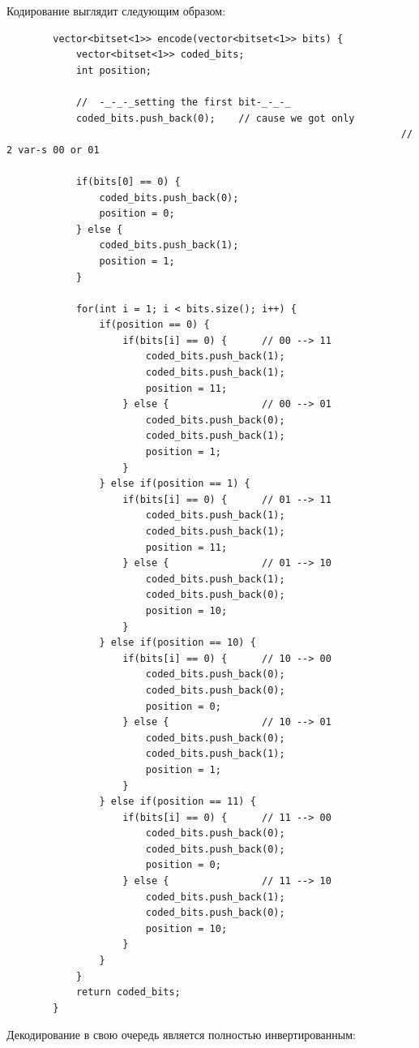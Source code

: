 \documentclass[utf8,14pt,a4paper,oneside,russian]{book}
\begin{document}
	Кодирование выглядит следующим образом:
	\begin{lstlisting}
		vector<bitset<1>> encode(vector<bitset<1>> bits) {
			vector<bitset<1>> coded_bits;
			int position;
			
			//  -_-_-_setting the first bit-_-_-_
			coded_bits.push_back(0);    // cause we got only
																	// 2 var-s 00 or 01
			
			if(bits[0] == 0) {
				coded_bits.push_back(0);
				position = 0;
			} else {
				coded_bits.push_back(1);
				position = 1;
			}
			
			for(int i = 1; i < bits.size(); i++) {
				if(position == 0) {
					if(bits[i] == 0) {      // 00 --> 11
						coded_bits.push_back(1);
						coded_bits.push_back(1);
						position = 11;
					} else {                // 00 --> 01
						coded_bits.push_back(0);
						coded_bits.push_back(1);
						position = 1;
					}
				} else if(position == 1) {
					if(bits[i] == 0) {      // 01 --> 11
						coded_bits.push_back(1);
						coded_bits.push_back(1);
						position = 11;
					} else {                // 01 --> 10
						coded_bits.push_back(1);
						coded_bits.push_back(0);
						position = 10;
					}
				} else if(position == 10) {
					if(bits[i] == 0) {      // 10 --> 00
						coded_bits.push_back(0);
						coded_bits.push_back(0);
						position = 0;
					} else {                // 10 --> 01
						coded_bits.push_back(0);
						coded_bits.push_back(1);
						position = 1;
					}
				} else if(position == 11) {
					if(bits[i] == 0) {      // 11 --> 00
						coded_bits.push_back(0);
						coded_bits.push_back(0);
						position = 0;
					} else {                // 11 --> 10
						coded_bits.push_back(1);
						coded_bits.push_back(0);
						position = 10;
					}
				}
			}
			return coded_bits;
		}
	\end{lstlisting}
	
	\newpage
		
	Декодирование в свою очередь является полностью инвертированным:
	
\end{document}
